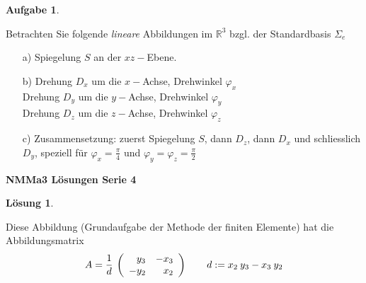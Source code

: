 \documentclass[10pt]{article}
\newtheorem{A}{Aufgabe}
\newtheorem{Lo}{L\"osung}
\newcommand{\R}{{\mathbb R}}
\newcommand{\VS}{\vspace{1cm}}
\newcommand{\hs}{\hspace{1cm}}
\begin{document}
\begin{sffamily}
\begin{A}  \end{A}
Betrachten Sie folgende {\em lineare} Abbildungen im $\R^3$ bzgl.
der Standardbasis $\Sigma_e$
\begin{enumerate}
\item[a)] Spiegelung $S$ an der $xz - $Ebene.
\item[b)] Drehung $D_x$ um die $x - $Achse, Drehwinkel $\varphi_x$\\
          Drehung $D_y$ um die $y - $Achse, Drehwinkel $\varphi_y$\\
      Drehung $D_z$ um die $z - $Achse, Drehwinkel $\varphi_z$
\item[c)] Zusammensetzung: zuerst Spiegelung $S$, dann $D_z$, dann
$D_x$ und schliesslich $D_y$, speziell f\"ur $\varphi_x =
\frac{\pi}{4}$ und $\varphi_y = \varphi_z =  \frac{\pi}{2}$
\end{enumerate}


\newpage


\begin{center}
{\bf NMMa3 \hs L\"osungen \hs Serie 4}
\end{center}

\VS
\begin{Lo}  \end{Lo}
Diese Abbildung (Grundaufgabe der Methode der finiten Elemente) hat
die Abbildungsmatrix
\[
 A = \frac{1}{d}\:\left( \begin{array}{r r}
                         y_3 & -x_3\\
             -y_2 & x_2
                         \end{array} \right)\qquad d := x_2\:y_3 - x_3\:y_2
\]


\end{sffamily}
\end{document}
